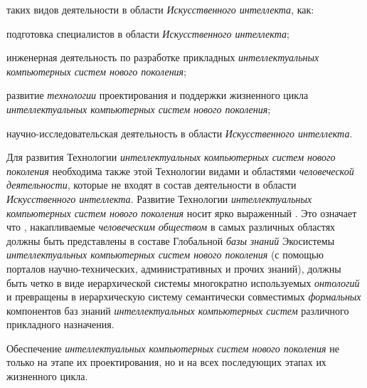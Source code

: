 \begin{textitemize}
	\item {} таких видов деятельности в области \textit{Искусственного интеллекта}, как:
	\begin{textitemize}
		\item подготовка специалистов в области \textit{Искусственного интеллекта};
		\item инженерная деятельность по разработке прикладных \textit{интеллектуальных компьютерных систем нового поколения};
		\item развитие \textit{технологии} проектирования и поддержки жизненного цикла \textit{интеллектуальных компьютерных систем нового поколения};
		\item научно-исследовательская деятельность в области \textit{Искусственного интеллекта}.
	\end{textitemize}
	\item Для развития Технологии \textit{интеллектуальных компьютерных систем нового поколения} необходима также  этой Технологии  видами и областями \textit{человеческой деятельности}, которые не входят в состав деятельности в области \textit{Искусственного интеллекта}. Развитие Технологии \textit{интеллектуальных компьютерных систем нового поколения} носит ярко выраженный . Это означает что , накапливаемые \textit{человеческим обществом} в самых различных областях должны быть представлены в составе Глобальной \textit{базы знаний} Экосистемы \textit{интеллектуальных компьютерных систем нового поколения} (с помощью порталов научно-технических, административных и прочих знаний), должны быть четко  в виде иерархической системы  многократно используемых \textit{онтологий} и превращены в иерархическую систему семантически совместимых \textit{формальных} компонентов баз знаний \textit{интеллектуальных компьютерных систем} различного прикладного назначения.
	
	\item Обеспечение  \textit{интеллектуальных компьютерных систем нового поколения} не только на этапе их проектирования, но и на всех последующих этапах их жизненного цикла.
	

\end{textitemize}
